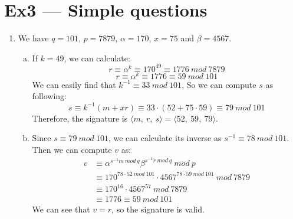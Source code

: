 \documentclass[12pt, a4paper]{article}
\begin{document}
\section*{Ex3 --- Simple questions}
\begin{enumerate}
    \item We have $q=101$, $p=7879$, $\alpha = 170$, $x = 75$ and $\beta = 4567$. 
          \begin{enumerate}[a)]
            \item If $k = 49$, we can calculate:
                  $$r \equiv \alpha^k \equiv 170^{49} \equiv 1776\ mod\ 7879$$
                  $$r \equiv \alpha^k \equiv 1776 \equiv 59\ mod\ 101$$
                  We can easily find that $k^{-1} \equiv 33\ mod\ 101$, So we can compute $s$ as following:
                  $$s \equiv k^{-1}(m + xr) \equiv 33\cdot(52 + 75\cdot 59) \equiv 79\ mod\ 101$$
                  Therefore, the signature is $\langle m,\ r,\ s\rangle = \langle 52,\ 59,\ 79\rangle$.
            \item Since $s \equiv 79\ mod\ 101$, we can calculate its inverse as $s^{-1} \equiv 78\ mod\ 101$. 
                  Then we can compute $v$ as:
                  \begin{align*}
                    v &\equiv \alpha^{s^{-1}m\ mod\ q}\beta^{s^{-1}r\ mod\ q}\ mod\ p\\
                      &\equiv 170^{78\cdot 52\ mod\ 101}\cdot 4567^{78\cdot 59\ mod\ 101}\ mod\ 7879\\
                      &\equiv 170^{16}\cdot 4567^{57}\ mod\ 7879\\
                      &\equiv 1776 \equiv 59\ mod\ 101
                  \end{align*}
                  We can see that $v = r$, so the signature is valid.


\end{enumerate}
\end{enumerate}
\end{document}
